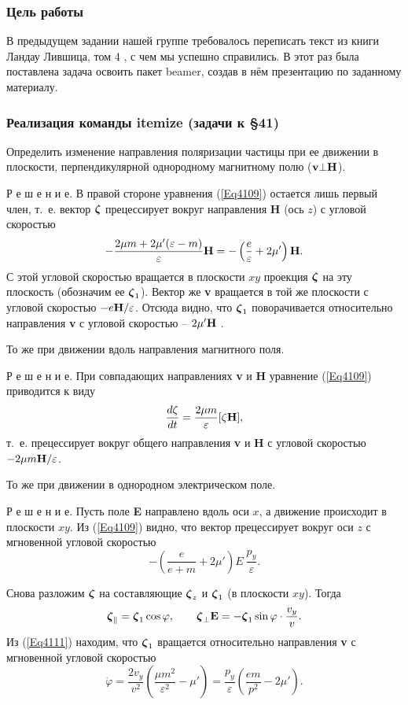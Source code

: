 \begin{frame}
\maketitle
\end{frame}

\begin{frame}
\frametitle{\rmfamily Цель работы}
В предыдущем задании нашей группе требовалось переписать текст из книги Ландау Лившица, том 4 \cite{LL}, с чем мы успешно справились. В этот раз была поставлена задача освоить пакет beamer, создав в нём презентацию по заданному материалу.

\end{frame}
\begin{frame}
\frametitle{Реализация команды itemize (задачи к \S41)}
\begin{itemize}
\item { Определить изменение направления поляризации частицы при ее 
движении в плоскости, перпендикулярной однородному магнитному полю
(${\bf v \bot H}$).

Р е ш е н и е. В правой стороне уравнения (\ref{Eq4109}) остается лишь первый член, т.~е. вектор $\mbox{\boldmath $\zeta$}$ прецессирует вокруг направления {\bf H} (ось $z$) с угловой скоростью
$$ -\frac{2\mu m + 2\mu '(\varepsilon - m)}{\varepsilon}{\bf H} = 
-\left(\frac{e}{\varepsilon}+2\mu'\right){\bf H}.$$
С этой угловой скоростью вращается в плоскости $xy$ проекция $\mbox{\boldmath $\zeta$}$
на эту плоскость (обозначим ее $\mbox{\boldmath $\zeta$}_1$). Вектор же {\bf v} вращается в той же плоскости с угловой скоростью $-e{\bf H}/{\varepsilon}$.
 Отсюда видно, что 
$\mbox{\boldmath $\zeta$}_1$ поворачивается относительно направления {\bf v} с угловой скоростью -- $2\mu'{\bf H}$ .
\item То же при движении вдоль направления магнитного поля.

Р е ш е н и е. При совпадающих направлениях {\bf v} и {\bf H} уравнение
 (\ref{Eq4109}) приводится к виду
 $$\frac{d\zeta}{dt} = \frac{2\mu m}{\varepsilon}[\zeta {\bf H}],$$
 т.~е. \vc {\zeta} прецессирует вокруг общего направления {\bf v}
  и {\bf H} с угловой скоростью $-2\mu m {\bf H}/{\varepsilon}$.
\item То же при движении в однородном электрическом поле.

Р е ш е н и е. Пусть поле {\bf E} направлено вдоль оси $x$, а движение происходит в плоскости $xy$. Из (\ref{Eq4109})
  видно, что вектор \vc{\zeta} прецессирует вокруг оси $z$ с мгновенной угловой скоростью
  $$-\left(\frac{e}{e+m}+2\mu'\right)E \:\frac{p_y}{\varepsilon}.$$

  Снова разложим $\mbox{\boldmath $\zeta$}$ на составляющие $\mbox{\boldmath $\zeta$}_z$ и 
  $\mbox{\boldmath $\zeta$}_1$
  (в плоскости $xy$). Тогда 
  $$\mbox{\boldmath $\zeta$}_{\|} = \mbox{\boldmath $\zeta$}_1 \cos \varphi, \qquad
  \mbox{\boldmath $\zeta$}_{\bot}{\bf E}= -\mbox{\boldmath $\zeta$}_1 
  \sin \varphi \cdot \frac{v_y}{v}.
  $$
  Из (\ref{Eq4111}) находим, что $\mbox{\boldmath $\zeta$}_1$ вращается относительно направления {\bf v} с мгновенной угловой скоростью 
  $$\dot \varphi = \frac{2v_y}{v^2}\left(\frac{\mu m^2}{\varepsilon^2 
  }- \mu'\right) = \frac{p_y}{\varepsilon}\left(\frac{em}{p^2}
  -2\mu'\right).$$}
\end{itemize}
\end{frame}


